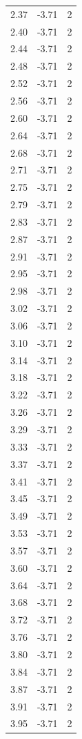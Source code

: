 \begin{longtable}{lrr}
  2.37 & -3.71 & 2 \\
  2.40 & -3.71 & 2 \\
  2.44 & -3.71 & 2 \\
  2.48 & -3.71 & 2 \\
  2.52 & -3.71 & 2 \\
  2.56 & -3.71 & 2 \\
  2.60 & -3.71 & 2 \\
  2.64 & -3.71 & 2 \\
  2.68 & -3.71 & 2 \\
  2.71 & -3.71 & 2 \\
  2.75 & -3.71 & 2 \\
  2.79 & -3.71 & 2 \\
  2.83 & -3.71 & 2 \\
  2.87 & -3.71 & 2 \\
  2.91 & -3.71 & 2 \\
  2.95 & -3.71 & 2 \\
  2.98 & -3.71 & 2 \\
  3.02 & -3.71 & 2 \\
  3.06 & -3.71 & 2 \\
  3.10 & -3.71 & 2 \\
  3.14 & -3.71 & 2 \\
  3.18 & -3.71 & 2 \\
  3.22 & -3.71 & 2 \\
  3.26 & -3.71 & 2 \\
  3.29 & -3.71 & 2 \\
  3.33 & -3.71 & 2 \\
  3.37 & -3.71 & 2 \\
  3.41 & -3.71 & 2 \\
  3.45 & -3.71 & 2 \\
  3.49 & -3.71 & 2 \\
  3.53 & -3.71 & 2 \\
  3.57 & -3.71 & 2 \\
  3.60 & -3.71 & 2 \\
  3.64 & -3.71 & 2 \\
  3.68 & -3.71 & 2 \\
  3.72 & -3.71 & 2 \\
  3.76 & -3.71 & 2 \\
  3.80 & -3.71 & 2 \\
  3.84 & -3.71 & 2 \\
  3.87 & -3.71 & 2 \\
  3.91 & -3.71 & 2 \\
  3.95 & -3.71 & 2 \\

\end{longtable}
